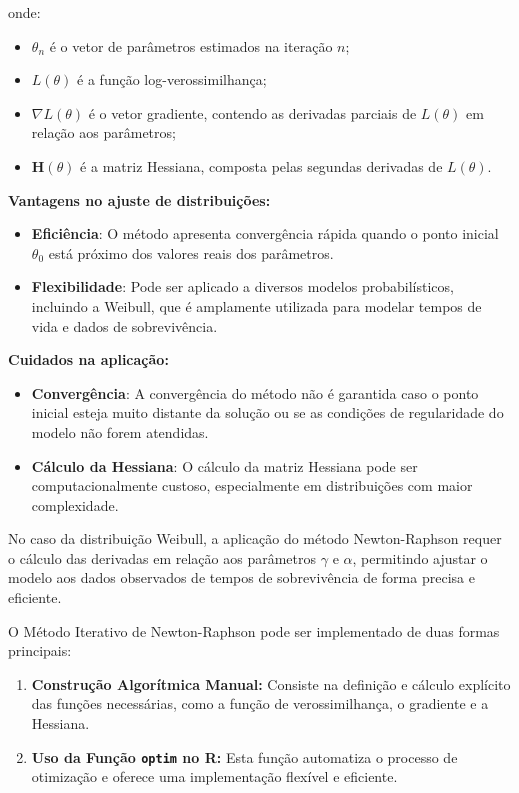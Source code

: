 \documentclass[
  12pt,
  letterpaper,
  DIV=11,
  numbers=noendperiod]{scrreprt}
\providecommand{\tightlist}{%
  \setlength{\itemsep}{0pt}\setlength{\parskip}{0pt}}\usepackage{longtable,booktabs,array}
\begin{document}
onde:

\begin{itemize}
\tightlist
\item
  \(\theta_{n}\) é o vetor de parâmetros estimados na iteração \(n\);
\item
  \(L(\theta)\) é a função log-verossimilhança;
\item
  \(\nabla L(\theta)\) é o vetor gradiente, contendo as derivadas
  parciais de \(L(\theta)\) em relação aos parâmetros;
\item
  \(\mathbf{H}(\theta)\) é a matriz Hessiana, composta pelas segundas
  derivadas de \(L(\theta)\).
\end{itemize}

\textbf{Vantagens no ajuste de distribuições:}

\begin{itemize}
\tightlist
\item
  \textbf{Eficiência}: O método apresenta convergência rápida quando o
  ponto inicial \(\theta_{0}\) está próximo dos valores reais dos
  parâmetros.
\item
  \textbf{Flexibilidade}: Pode ser aplicado a diversos modelos
  probabilísticos, incluindo a Weibull, que é amplamente utilizada para
  modelar tempos de vida e dados de sobrevivência.
\end{itemize}

\textbf{Cuidados na aplicação:}

\begin{itemize}
\tightlist
\item
  \textbf{Convergência}: A convergência do método não é garantida caso o
  ponto inicial esteja muito distante da solução ou se as condições de
  regularidade do modelo não forem atendidas.
\item
  \textbf{Cálculo da Hessiana}: O cálculo da matriz Hessiana pode ser
  computacionalmente custoso, especialmente em distribuições com maior
  complexidade.
\end{itemize}

No caso da distribuição Weibull, a aplicação do método Newton-Raphson
requer o cálculo das derivadas em relação aos parâmetros \(\gamma\) e
\(\alpha\), permitindo ajustar o modelo aos dados observados de tempos
de sobrevivência de forma precisa e eficiente.

O Método Iterativo de Newton-Raphson pode ser implementado de duas
formas principais:

\begin{enumerate}
\def\labelenumi{\arabic{enumi}.}
\tightlist
\item
  \textbf{Construção Algorítmica Manual:} Consiste na definição e
  cálculo explícito das funções necessárias, como a função de
  verossimilhança, o gradiente e a Hessiana.
\item
  \textbf{Uso da Função \texttt{optim} no R:} Esta função automatiza o
  processo de otimização e oferece uma implementação flexível e
  eficiente.
\end{enumerate}
\end{document}
